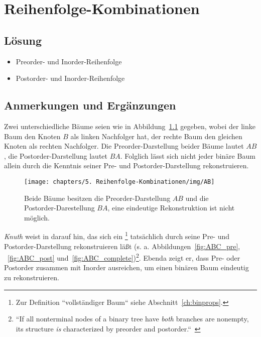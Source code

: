 \chapter{Reihenfolge-Kombinationen}

\section*{Lösung}

\begin{itemize}
    \item Preorder- und Inorder-Reihenfolge
    \item Postorder- und Inorder-Reihenfolge
\end{itemize}


\section*{Anmerkungen und Ergänzungen}

Zwei unterschiedliche Bäume seien wie in Abbildung~\ref{fig:AB} gegeben, wobei der linke Baum den Knoten $B$ als linken
Nachfolger hat, der rechte Baum den gleichen Knoten als rechten Nachfolger.
Die Preorder-Darstellung beider Bäume lautet $AB$, die Postorder-Darstellung lautet $BA$.
Folglich lässt sich nicht jeder binäre Baum allein durch die Kenntnis seiner Pre- und Postorder-Darstellung  rekonstruieren.

\begin{figure}[h]
    \centering
    \texttt{[image: chapters/5. Reihenfolge-Kombinationen/img/AB]}
    \caption{Beide Bäume besitzen die Preorder-Darstellung $AB$ und die Postorder-Darestellung $BA$, eine eindeutige Rekonstruktion ist nicht möglich.}
    \label{fig:AB}
\end{figure}

\textit{Knuth} weist in \cite[564]{Knu97} darauf hin, das sich ein \footnote{
    Zur Definition ``vollständiger Baum`` siehe Abschnitt~\ref{ch:binprops}.
} tatsächlich durch seine Pre- und Postorder-Darstellung rekonstruieren läßt ({s. a.} Abbildungen~\ref{fig:ABC_pre}, ~\ref{fig:ABC_post} und~\ref{fig:ABC_complete})\footnote{
    ``If all nonterminal nodes of a binary tree have \textit{both} branches are nonempty, its structure \textit{is} characterized by preorder and postorder.``~\cite[564, 7., Hervorhebungen i.O.]{Knu97}
}.
Ebenda zeigt er, dass Pre- oder Postorder zusammen mit Inorder ausreichen, um einen binären Baum eindeutig zu rekonstruieren.

